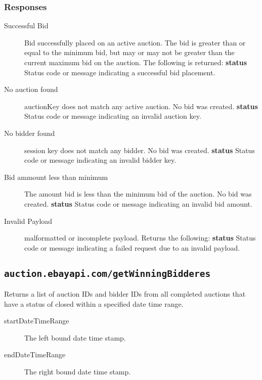\documentclass{article}
\newcommand{\code}[1]{\colorbox{light-gray}{\texttt{#1}}}
\begin{document}
\subsubsection{Responses}

\begin{description}

    \item[Successful Bid] Bid successfully placed on an active auction. The bid
        is greater than or equal to the minimum bid, but may or may not be
        greater than the current maximum bid on the auction. The following is
        returned:
        \subitem\textbf{status} Status code or message indicating a successful
        bid placement.

    \item[No auction found] auctionKey does not match any active auction. No
        bid was created.
        \subitem\textbf{status} Status code or message indicating an invalid
        auction key.

    \item[No bidder found] session key does not match any bidder. No bid was
        created.
        \subitem\textbf{status} Status code or message indicating an invalid
        bidder key.

    \item[Bid ammount less than minimum] The amount bid is less than the
        minimum bid of the auction. No bid was created.
        \subitem\textbf{status} Status code or message indicating an invalid
        bid amount.

    \item[Invalid Payload] malformatted or incomplete payload. Returns the
        following:
        \subitem\textbf{status} Status code or message indicating a failed
        request due to an invalid payload.
\end{description}

\subsection{\code{auction.ebayapi.com/getWinningBidderes}}
Returns a list of auction IDs and bidder IDs from all completed auctions that
have a status of closed within a specified date time range.

\begin{description}
    \item[startDateTimeRange] The left bound date time stamp.
    \item[endDateTimeRange] The right bound date time stamp.
\end{description}
 
\end{document}
